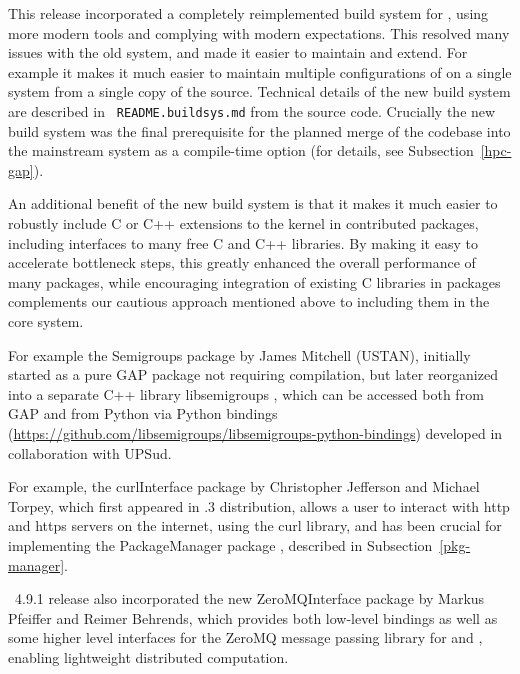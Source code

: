 This release incorporated a completely
reimplemented build system for \GAP, using more modern tools and
complying with modern expectations. This resolved many issues with the
old system, and made it easier to maintain and extend. For example it
makes it much easier to maintain multiple configurations of \GAP on a
single system from a single copy of the source. Technical
details of the new build system are described in {\tt
  README.buildsys.md} from the \GAP source code. Crucially the new build system
was the final prerequisite for the planned  merge of the \HPCGAP codebase  into the
mainstream \GAP system as a compile-time option (for details, see
Subsection~\ref{hpc-gap}).

An additional benefit of the new build system is that it makes it much
easier to robustly include C or C++ extensions to the \GAP kernel in
contributed packages, including interfaces to many free C and C++
libraries. By making it easy to accelerate bottleneck steps, this
greatly enhanced the overall performance of many packages, while
encouraging integration of existing C libraries in packages complements
our cautious approach mentioned above to including them in the core
system.

For example the {\sf Semigroups} package \cite{Semigroups} 
by James Mitchell (USTAN), initially started as a pure GAP
package not requiring compilation, but later reorganized into a
separate C++ library libsemigroups , which can be
accessed both from GAP and from Python via Python bindings
(\url{https://github.com/libsemigroups/libsemigroups-python-bindings})
developed in collaboration with UPSud. 

For example, the {\sf curlInterface} package \cite{curlInterface}
by Christopher Jefferson and Michael Torpey, which first appeared
in .3 distribution, allows a user to interact 
with http and https servers on the internet, using the {\sf curl} library, 
and has been crucial for implementing the {\sf PackageManager} package
\cite{PackageManager}, described in Subsection~\ref{pkg-manager}.

\GAP~4.9.1 release also incorporated the new {\sf ZeroMQInterface}
package
\cite{ZeroMQInterface} by Markus Pfeiffer and Reimer Behrends, which
provides both low-level bindings as well as some higher level interfaces
for the {\sf ZeroMQ} message passing library for \GAP and \HPCGAP, 
enabling lightweight distributed computation. 

